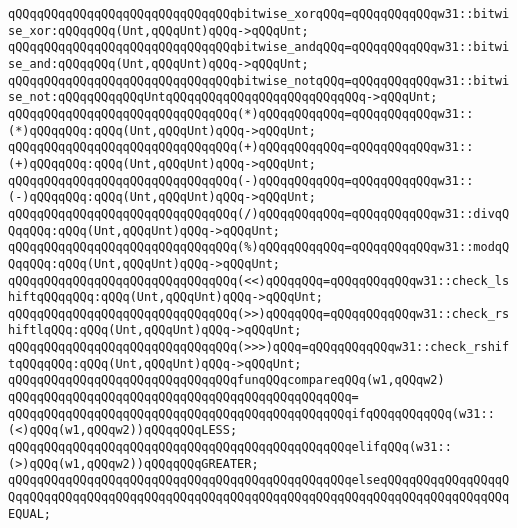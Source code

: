 \verb|qQQqqQQqqQQqqQQqqQQqqQQqqQQqqQQqbitwise_xorqQQq=qQQqqQQqqQQqw31::bitwise_xor:qQQqqQQq(Unt,qQQqUnt)qQQq->qQQqUnt;|\newline
\verb|qQQqqQQqqQQqqQQqqQQqqQQqqQQqqQQqbitwise_andqQQq=qQQqqQQqqQQqw31::bitwise_and:qQQqqQQq(Unt,qQQqUnt)qQQq->qQQqUnt;|\newline
\verb|qQQqqQQqqQQqqQQqqQQqqQQqqQQqqQQqbitwise_notqQQq=qQQqqQQqqQQqw31::bitwise_not:qQQqqQQqqQQqUntqQQqqQQqqQQqqQQqqQQqqQQqqQQq->qQQqUnt;|\newline
\newline
\verb|qQQqqQQqqQQqqQQqqQQqqQQqqQQqqQQq(*)qQQqqQQqqQQq=qQQqqQQqqQQqw31::(*)qQQqqQQq:qQQq(Unt,qQQqUnt)qQQq->qQQqUnt;|\newline
\verb|qQQqqQQqqQQqqQQqqQQqqQQqqQQqqQQq(+)qQQqqQQqqQQq=qQQqqQQqqQQqw31::(+)qQQqqQQq:qQQq(Unt,qQQqUnt)qQQq->qQQqUnt;|\newline
\verb|qQQqqQQqqQQqqQQqqQQqqQQqqQQqqQQq(-)qQQqqQQqqQQq=qQQqqQQqqQQqw31::(-)qQQqqQQq:qQQq(Unt,qQQqUnt)qQQq->qQQqUnt;|\newline
\verb|qQQqqQQqqQQqqQQqqQQqqQQqqQQqqQQq(/)qQQqqQQqqQQq=qQQqqQQqqQQqw31::divqQQqqQQq:qQQq(Unt,qQQqUnt)qQQq->qQQqUnt;|\newline
\verb|qQQqqQQqqQQqqQQqqQQqqQQqqQQqqQQq(%)qQQqqQQqqQQq=qQQqqQQqqQQqw31::modqQQqqQQq:qQQq(Unt,qQQqUnt)qQQq->qQQqUnt;|\newline
\newline
\verb|qQQqqQQqqQQqqQQqqQQqqQQqqQQqqQQq(<<)qQQqqQQq=qQQqqQQqqQQqw31::check_lshiftqQQqqQQq:qQQq(Unt,qQQqUnt)qQQq->qQQqUnt;|\newline
\verb|qQQqqQQqqQQqqQQqqQQqqQQqqQQqqQQq(>>)qQQqqQQq=qQQqqQQqqQQqw31::check_rshiftlqQQq:qQQq(Unt,qQQqUnt)qQQq->qQQqUnt;|\newline
\verb|qQQqqQQqqQQqqQQqqQQqqQQqqQQqqQQq(>>>)qQQq=qQQqqQQqqQQqw31::check_rshiftqQQqqQQq:qQQq(Unt,qQQqUnt)qQQq->qQQqUnt;|\newline
\newline
\verb|qQQqqQQqqQQqqQQqqQQqqQQqqQQqqQQqfunqQQqcompareqQQq(w1,qQQqw2)|\newline
\verb|qQQqqQQqqQQqqQQqqQQqqQQqqQQqqQQqqQQqqQQqqQQqqQQq=|\newline
\verb|qQQqqQQqqQQqqQQqqQQqqQQqqQQqqQQqqQQqqQQqqQQqqQQqifqQQqqQQqqQQq(w31::(<)qQQq(w1,qQQqw2))qQQqqQQqLESS;|\newline
\verb|qQQqqQQqqQQqqQQqqQQqqQQqqQQqqQQqqQQqqQQqqQQqqQQqelifqQQq(w31::(>)qQQq(w1,qQQqw2))qQQqqQQqGREATER;|\newline
\verb|qQQqqQQqqQQqqQQqqQQqqQQqqQQqqQQqqQQqqQQqqQQqqQQqelseqQQqqQQqqQQqqQQqqQQqqQQqqQQqqQQqqQQqqQQqqQQqqQQqqQQqqQQqqQQqqQQqqQQqqQQqqQQqqQQqqQQqqQQqEQUAL;|\newline

